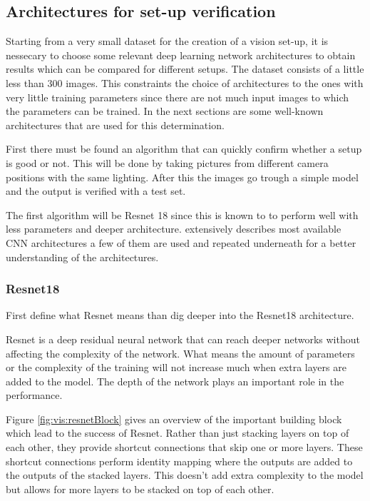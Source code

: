	\subsection{Architectures for set-up verification}
		Starting from a very small dataset for the creation of a vision set-up, it is nessecary to choose some relevant deep learning network architectures to obtain results which can be compared for different setups. 
		The dataset consists of a little less than 300 images. This constraints the choice of architectures to the ones with very little training parameters since there are not much input images to which the parameters can be trained. In the next sections are some well-known architectures that are used for this determination.
		
		First there must be found an algorithm that can quickly confirm whether a setup is good or not. This will be done by taking pictures from different camera positions with the same lighting. After this the images go trough a simple model and the output is verified with a test set. 
		
		The first algorithm will be Resnet 18 since this is known to to perform well with less parameters and deeper architecture. 
		\cite{Khan2020} extensively describes most available CNN architectures a few of them are used and repeated underneath for a better understanding of the architectures.
		
		\subsubsection{Resnet18}
			First define what Resnet \cite{He2016} means than dig deeper into the Resnet18 architecture.
			
			Resnet is a deep residual neural network that can reach deeper networks without affecting the complexity of the network. What means the amount of parameters or the complexity of the training will not increase much when extra layers are added to the model. 
			The depth of the network plays an important role in the performance. 
			
			Figure \ref{fig:vis:resnetBlock} gives an overview of the important building block which lead to the success of Resnet.  Rather than just stacking layers on top of each other, they provide shortcut connections that skip one or more layers. These shortcut connections perform identity mapping where the outputs are added to the outputs of the stacked layers. This doesn't add extra complexity to the model but allows for more layers to be stacked on top of each other.
			
